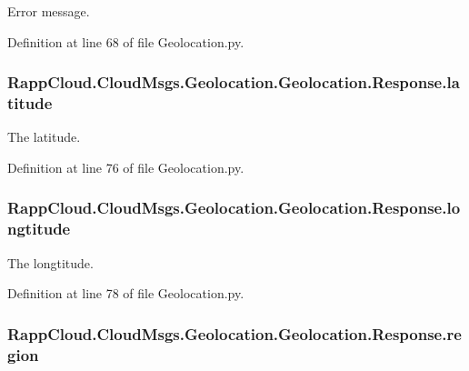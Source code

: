 Error message. 



Definition at line 68 of file Geolocation.\-py.

\hypertarget{classRappCloud_1_1CloudMsgs_1_1Geolocation_1_1Geolocation_1_1Response_a0b5a2ed137077f4035401f5ad67d46a7}{
\subsubsection[{latitude}]{\setlength{\rightskip}{0pt plus 5cm}Rapp\-Cloud.\-Cloud\-Msgs.\-Geolocation.\-Geolocation.\-Response.\-latitude}}\label{classRappCloud_1_1CloudMsgs_1_1Geolocation_1_1Geolocation_1_1Response_a0b5a2ed137077f4035401f5ad67d46a7}


The latitude. 



Definition at line 76 of file Geolocation.\-py.

\hypertarget{classRappCloud_1_1CloudMsgs_1_1Geolocation_1_1Geolocation_1_1Response_a8afb082c846c8c98e9dcbfd917977c34}{
\subsubsection[{longtitude}]{\setlength{\rightskip}{0pt plus 5cm}Rapp\-Cloud.\-Cloud\-Msgs.\-Geolocation.\-Geolocation.\-Response.\-longtitude}}\label{classRappCloud_1_1CloudMsgs_1_1Geolocation_1_1Geolocation_1_1Response_a8afb082c846c8c98e9dcbfd917977c34}


The longtitude. 



Definition at line 78 of file Geolocation.\-py.

\hypertarget{classRappCloud_1_1CloudMsgs_1_1Geolocation_1_1Geolocation_1_1Response_aaa1fe42108d5665b8e05916211932a09}{
\subsubsection[{region}]{\setlength{\rightskip}{0pt plus 5cm}Rapp\-Cloud.\-Cloud\-Msgs.\-Geolocation.\-Geolocation.\-Response.\-region}}\label{classRappCloud_1_1CloudMsgs_1_1Geolocation_1_1Geolocation_1_1Response_aaa1fe42108d5665b8e05916211932a09}


